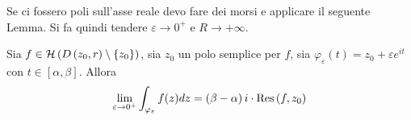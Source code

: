 Se ci fossero poli sull'asse reale devo fare dei morsi e applicare il seguente Lemma. Si fa quindi tendere $\varepsilon \rightarrow 0^{+}$ e $R\rightarrow + \infty $.
\begin{thm}
 Sia $f\in \Hc \left(D\left(z_{0}, r\right) \setminus \left\{z_{0}\right\}\right)$, sia $z_{0}$ un polo semplice per $f$, sia $\varphi_{\varepsilon}(t) = z_{0} + \varepsilon e^{it}$ con $t\in \left[ \alpha, \beta \right]$. Allora
\begin{equation*}
\lim_{\varepsilon \rightarrow 0^{+}}\int_{\varphi_{\varepsilon}} f(z) dz = \left(\beta - \alpha \right) i \cdot \Res \left(f, z_{0}\right)
\end{equation*}
\end{thm}
\begin{figure}[htpb]
	\centering
{} %

\begin{tikzpicture}[x = 0.75pt, y = 0.75pt, yscale = -1, xscale = 1]


\end{tikzpicture}
\end{figure}
